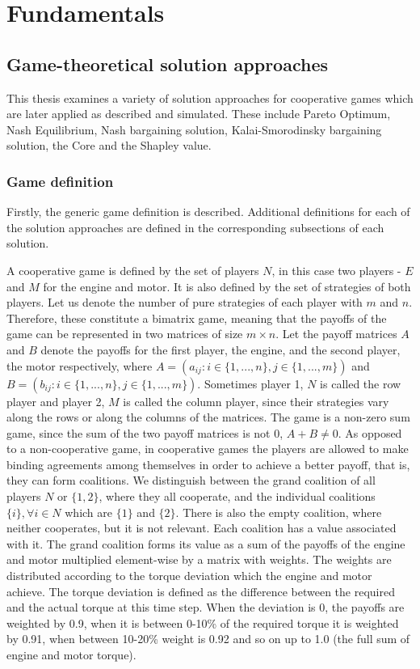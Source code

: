 \chapter{Fundamentals}
\label{chp:basics}

\section{Game-theoretical solution approaches}
This thesis examines a variety of solution approaches for cooperative games which are later applied as described and simulated. These include Pareto Optimum, Nash Equilibrium, Nash bargaining solution, Kalai-Smorodinsky bargaining solution, the Core and the Shapley value.

\subsection{Game definition}
Firstly, the generic game definition is described. Additional definitions for each of the solution approaches are defined in the corresponding subsections of each solution.

A cooperative game is defined by the set of players $N$, in this case two players - $E$ and $M$ for the engine and motor. It is also defined by the set of strategies of both players. Let us denote the number of pure strategies of each player with $m$ and $n$. Therefore, these constitute a bimatrix game, meaning that the payoffs of the game can be represented in two matrices of size $m \times n$. Let the payoff matrices $A$ and $B$ denote the payoffs for the first player, the engine, and the second player, the motor respectively, where $A = (a_{ij}: i \in \{1,...,n\}, j \in \{ 1,...,m\})$ and $B = (b_{ij}: i \in \{1,...,n\}, j \in \{ 1,...,m\})$. Sometimes player 1, $N$ is called  the row player and player 2, $M$ is called the column player, since their strategies vary along the rows or along the columns of the matrices. The game is a non-zero sum game, since the sum of the two payoff matrices is not 0, $A + B \neq 0$.
As opposed to a non-cooperative game, in cooperative games the players are allowed to make binding agreements among themselves in order to achieve a better payoff, that is, they can form coalitions. We distinguish between the grand coalition of all players $N$ or $\{1,2\}$, where they all cooperate, and the individual coalitions $\{i\}, \forall i \in N$ which are $\{1\}$ and $\{2\}$. There is also the empty coalition, where neither cooperates, but it is not relevant. Each coalition has a value associated with it. The grand coalition forms its value as a sum of the payoffs of the engine and motor multiplied element-wise by a matrix with weights. The weights are distributed according to the torque deviation which the engine and motor achieve. The torque deviation is defined as the difference between the required and the actual torque at this time step. When the deviation is 0, the payoffs are weighted by 0.9, when it is between 0-10\% of the required torque it is weighted by 0.91, when between 10-20\% weight is 0.92 and so on up to 1.0 (the full sum of engine and motor torque).


